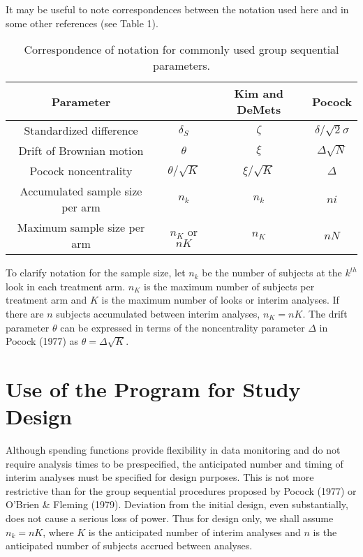 It may be useful to note correspondences between the notation used here and
in some other references (see Table 1).
\begin{table}
\caption{Correspondence of notation for commonly used group sequential
parameters.}
\begin{center}
\begin{tabular}{c|c|c|c} \hline
  \multicolumn{1}{c}{Parameter}      &
  \multicolumn{1}{c}{}               &
  \multicolumn{1}{c}{Kim and DeMets} &
  \multicolumn{1}{c}{Pocock}         \\ \hline
  Standardized difference  & $\delta_S$ & $\zeta$ & $\delta / \sqrt{2} \sigma$\\
  Drift of Brownian motion & $\theta$   & $\xi$   & $\Delta \sqrt{N}$         \\
  Pocock noncentrality & $\theta / \sqrt{K}$ & $\xi / \sqrt{K}$ & $\Delta$ \\
  Accumulated sample size per arm & $n_k$& $n_k$   & $ni$               \\
  Maximum sample size per arm & $n_K$ or $nK$ & $n_K$ & $nN$ \\
\hline
\end{tabular}
\end{center}
\end{table}
To clarify notation for the sample size, let $n_k$ be the number of
subjects at the $k^{th}$ look in each treatment arm.  $n_K$ is the maximum
number of subjects per treatment arm and $K$ is the maximum number of looks
or interim analyses.  If there are $n$ subjects accumulated between interim
analyses, $n_K = nK$.  The drift parameter $\theta$ can be expressed in
terms of the noncentrality parameter $\Delta$ in Pocock (1977) as $\theta =
\Delta \sqrt{K}$.



\section{Use of the Program for Study Design}

Although spending functions provide flexibility in data monitoring and
do not require analysis times to be prespecified, the anticipated number
and timing of interim analyses must be specified for design purposes.
This is not more restrictive than for the group sequential
procedures proposed by Pocock (1977) or O'Brien \& Fleming (1979).
Deviation from the initial design, even substantially, does not cause
a serious loss of power.  Thus for design only, we shall assume
$n_k = nK$, where $K$ is the anticipated number of interim analyses and $n$
is the anticipated number of subjects accrued between analyses.

